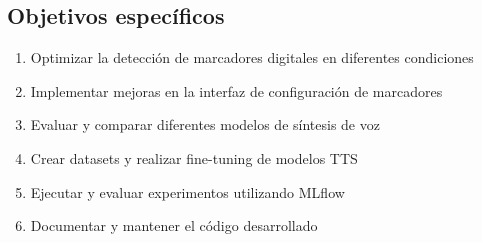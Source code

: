 \subsection{Objetivos específicos}
\begin{enumerate}
    \item Optimizar la detección de marcadores digitales en diferentes condiciones
    \item Implementar mejoras en la interfaz de configuración de marcadores
    \item Evaluar y comparar diferentes modelos de síntesis de voz
    \item Crear datasets y realizar fine-tuning de modelos TTS
    \item Ejecutar y evaluar experimentos utilizando MLflow
    \item Documentar y mantener el código desarrollado
\end{enumerate}